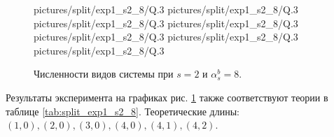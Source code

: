 \begin{figure}[H]
    \centering
       {pictures/split/exp1_s2_8/Q}{.3}
      {pictures/split/exp1_s2_8/Q}{.3}
      {pictures/split/exp1_s2_8/Q}{.3}
      {pictures/split/exp1_s2_8/Q}{.3}
      {pictures/split/exp1_s2_8/Q}{.3}
     {pictures/split/exp1_s2_8/Q}{.3}
     {pictures/split/exp1_s2_8/Q}{.3}
\caption{Численности видов системы при \(s=2\) и \(\alpha^b_s = 8\).} \label{fig:split_exp1_s2_8}
\end{figure}
Результаты эксперимента на графиках рис. \ref{fig:split_exp1_s2_8} также соответствуют теории в таблице \ref{tab:split_exp1_s2_8}. Теоретические длины: \( (1,0), (2,0), (3,0), (4,0), (4,1), (4,2) \).


